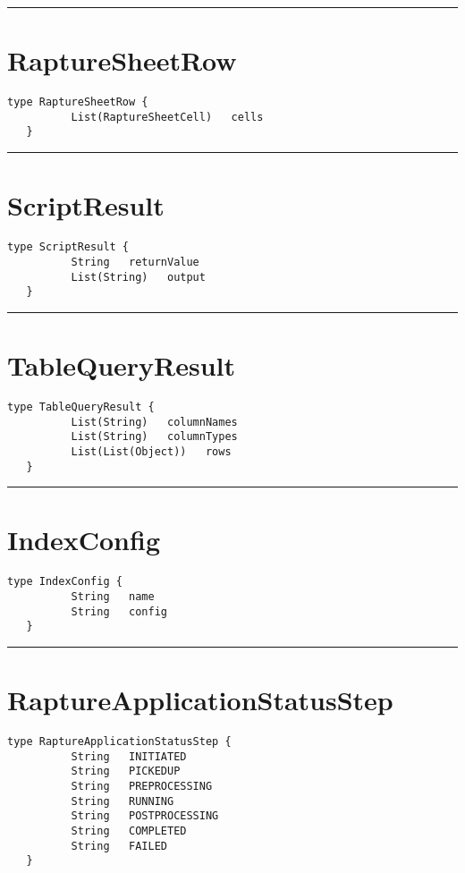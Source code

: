 \rule{12cm}{2pt}
\section{RaptureSheetRow}
\label{type:RaptureSheetRow}

\begin{lstlisting}[style=nonumbers]
   type RaptureSheetRow {
          List(RaptureSheetCell)   cells
   }
\end{lstlisting}

\rule{12cm}{2pt}
\section{ScriptResult}
\label{type:ScriptResult}

\begin{lstlisting}[style=nonumbers]
   type ScriptResult {
          String   returnValue
          List(String)   output
   }
\end{lstlisting}

\rule{12cm}{2pt}
\section{TableQueryResult}
\label{type:TableQueryResult}

\begin{lstlisting}[style=nonumbers]
   type TableQueryResult {
          List(String)   columnNames
          List(String)   columnTypes
          List(List(Object))   rows
   }
\end{lstlisting}

\rule{12cm}{2pt}
\section{IndexConfig}
\label{type:IndexConfig}

\begin{lstlisting}[style=nonumbers]
   type IndexConfig {
          String   name
          String   config
   }
\end{lstlisting}

\rule{12cm}{2pt}
\section{RaptureApplicationStatusStep}
\label{type:RaptureApplicationStatusStep}

\begin{lstlisting}[style=nonumbers]
   type RaptureApplicationStatusStep {
          String   INITIATED
          String   PICKEDUP
          String   PREPROCESSING
          String   RUNNING
          String   POSTPROCESSING
          String   COMPLETED
          String   FAILED
   }
\end{lstlisting}

